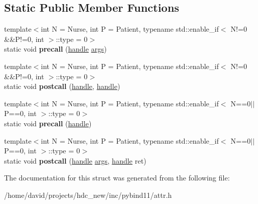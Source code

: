 \subsection*{Static Public Member Functions}
\begin{DoxyCompactItemize}
\item 
{\footnotesize template$<$int N = Nurse, int P = Patient, typename std\+::enable\+\_\+if$<$ N!=0 \&\&\+P!=0, int $>$\+::type  = 0$>$ }\\static void {\bfseries precall} (\hyperlink{classhandle}{handle} \hyperlink{classargs}{args})\hypertarget{structprocess__attribute_3_01keep__alive_3_01_nurse_00_01_patient_01_4_01_4_a500770f3af9b717131d7d5d40f16d0c5}{}\label{structprocess__attribute_3_01keep__alive_3_01_nurse_00_01_patient_01_4_01_4_a500770f3af9b717131d7d5d40f16d0c5}

\item 
{\footnotesize template$<$int N = Nurse, int P = Patient, typename std\+::enable\+\_\+if$<$ N!=0 \&\&\+P!=0, int $>$\+::type  = 0$>$ }\\static void {\bfseries postcall} (\hyperlink{classhandle}{handle}, \hyperlink{classhandle}{handle})\hypertarget{structprocess__attribute_3_01keep__alive_3_01_nurse_00_01_patient_01_4_01_4_a4e40d31e072827eebb51db5089a5fb83}{}\label{structprocess__attribute_3_01keep__alive_3_01_nurse_00_01_patient_01_4_01_4_a4e40d31e072827eebb51db5089a5fb83}

\item 
{\footnotesize template$<$int N = Nurse, int P = Patient, typename std\+::enable\+\_\+if$<$ N==0$\vert$$\vert$\+P==0, int $>$\+::type  = 0$>$ }\\static void {\bfseries precall} (\hyperlink{classhandle}{handle})\hypertarget{structprocess__attribute_3_01keep__alive_3_01_nurse_00_01_patient_01_4_01_4_a4a3d34b9ee13b547b202e0eefef5fa03}{}\label{structprocess__attribute_3_01keep__alive_3_01_nurse_00_01_patient_01_4_01_4_a4a3d34b9ee13b547b202e0eefef5fa03}

\item 
{\footnotesize template$<$int N = Nurse, int P = Patient, typename std\+::enable\+\_\+if$<$ N==0$\vert$$\vert$\+P==0, int $>$\+::type  = 0$>$ }\\static void {\bfseries postcall} (\hyperlink{classhandle}{handle} \hyperlink{classargs}{args}, \hyperlink{classhandle}{handle} ret)\hypertarget{structprocess__attribute_3_01keep__alive_3_01_nurse_00_01_patient_01_4_01_4_a82f6b408dfb07821a610324ae37b17d3}{}\label{structprocess__attribute_3_01keep__alive_3_01_nurse_00_01_patient_01_4_01_4_a82f6b408dfb07821a610324ae37b17d3}

\end{DoxyCompactItemize}


The documentation for this struct was generated from the following file\+:\begin{DoxyCompactItemize}
\item 
/home/david/projects/hdc\+\_\+new/inc/pybind11/attr.\+h\end{DoxyCompactItemize}
